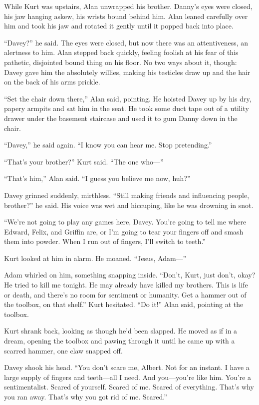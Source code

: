 While Kurt was upstairs, Alan unwrapped his brother.  Danny's eyes
were closed, his jaw hanging askew, his wrists bound behind him.  Alan
leaned carefully over him and took his jaw and rotated it gently until
it popped back into place.

``Davey?'' he said.  The eyes were closed, but now there was an
attentiveness, an alertness to him.  Alan stepped back quickly,
feeling foolish at his fear of this pathetic, disjointed bound thing
on his floor.  No two ways about it, though:  Davey gave him the
absolutely willies, making his testicles draw up and the hair on the
back of his arms prickle.

``Set the chair down there,'' Alan said, pointing.  He hoisted Davey
up by his dry, papery armpits and sat him in the seat.  He took some
duct tape out of a utility drawer under the basement staircase and
used it to gum Danny down in the chair.

``Davey,'' he said again.  ``I know you can hear me.  Stop
pretending.''

``That's your brother?'' Kurt said.  ``The one who---''

``That's him,'' Alan said.  ``I guess you believe me now, huh?''

Davey grinned suddenly, mirthless.  ``Still making friends and
influencing people, brother?'' he said.  His voice was wet and
hiccuping, like he was drowning in snot.

``We're not going to play any games here, Davey.  You're going to tell
me where Edward, Felix, and Griffin are, or I'm going to tear your
fingers off and smash them into powder.  When I run out of fingers,
I'll switch to teeth.''

Kurt looked at him in alarm.  He moaned.  ``Jesus, Adam---''

Adam whirled on him, something snapping inside.  ``Don't, Kurt, just
don't, okay?  He tried to kill me tonight.  He may already have killed
my brothers.  This is life or death, and there's no room for sentiment
or humanity.  Get a hammer out of the toolbox, on that shelf.'' Kurt
hesitated.  ``Do it!'' Alan said, pointing at the toolbox.

Kurt shrank back, looking as though he'd been slapped.  He moved as if
in a dream, opening the toolbox and pawing through it until he came up
with a scarred hammer, one claw snapped off.

Davey shook his head.  ``You don't scare me, Albert.  Not for an
instant.  I have a large supply of fingers and teeth---all I need. 
And you---you're like him.  You're a sentimentalist.  Scared of
yourself.  Scared of me.  Scared of everything.  That's why you ran
away.  That's why you got rid of me.  Scared.''

